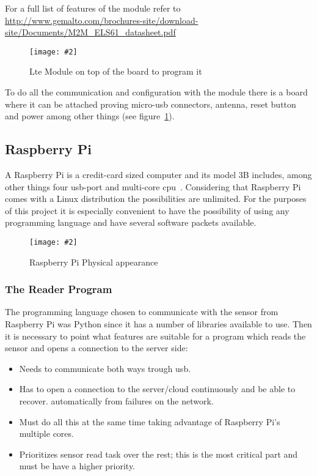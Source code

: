 \documentclass[hidelinks,11pt,a4paper,oneside,article]{memoir}
\newcommand{\putimage}[3][10] %
{
\begin{figure}[h]
	\centering
	\captionsetup{justification=centering}
	\texttt{[image: \#2]}
	\caption{#3}
	\label{fig:#2}
\end{figure}
}
\begin{document}
For a full list of features of the module refer to \url{http://www.gemalto.com/brochures-site/download-site/Documents/M2M_ELS61_datasheet.pdf}

	\putimage[5]{lte_board}{Lte Module on top of the board to program it}
    
To do all the communication and configuration with the module there is a board where it can be attached proving micro-usb connectors, antenna, reset button and power among other things (see figure~\ref{fig:lte_board}).





\subsection{Raspberry Pi}
A Raspberry Pi is a credit-card sized computer and  its model 3B includes, among other things four \gls{usb}-port and multi-core \gls{cpu}~\cite{rpi3}. Considering that Raspberry Pi comes with a Linux distribution the possibilities are unlimited. For the purposes of this project it is especially convenient to have the possibility of using any programming language and have several software packets available.

\putimage[5]{raspberry}{Raspberry Pi Physical appearance}

\subsubsection{The Reader Program}
The programming language chosen to communicate with the sensor from Raspberry Pi was Python since it has a number of libraries available to use. Then it is necessary to point what features are suitable for a program which reads the sensor and opens a connection to the server side:
\begin{itemize}
    \item Needs to communicate both ways trough \gls{usb}.
    \item Has to open a connection to the server/cloud continuously and be able to recover. automatically from failures on the network.
    \item Must do all this at the same time taking advantage of Raspberry Pi's multiple cores.
    \item Prioritizes sensor read task over the rest; this is the most critical part and must be have a higher priority.
\end{itemize}
\end{document}

